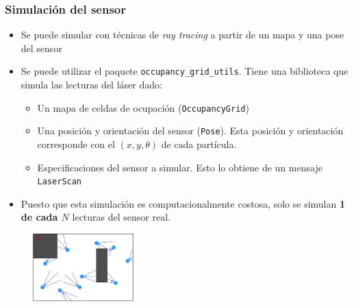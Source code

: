 \begin{frame}\frametitle{Simulación del sensor}
  \begin{itemize}
  \item Se puede simular con técnicas de \textit{ray tracing} a partir de un mapa y una pose del sensor
  \item Se puede utilizar el paquete \texttt{occupancy\_grid\_utils}. Tiene una biblioteca que simula las lecturas del láser dado:
    \begin{itemize}
    \item Un mapa de celdas de ocupación (\texttt{OccupancyGrid})
    \item Una posición y orientación del sensor (\texttt{Pose}). Esta posición y orientación corresponde con el $(x,y,\theta)$ de cada partícula.
    \item Especificaciones del sensor a simular. Esto lo obtiene de un mensaje \texttt{LaserScan}
    \end{itemize}
  \item Puesto que esta simulación es computacionalmente costosa, solo se simulan \textbf{1 de cada $N$} lecturas del sensor real. 
  \end{itemize}
  \begin{figure}
    \centering
    \includegraphics[width=0.35\textwidth]{Figures/MotionPlanning/ParticleFilter3.pdf}
  \end{figure}
\end{frame}

